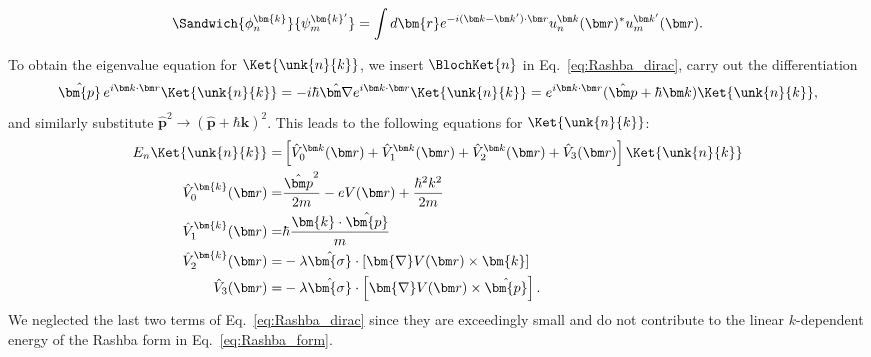 \begin{equation}
	\Sandwich{\phi_n^{\bm{k}}}{\psi_m^{\bm{k}'}} = \int d\bm{r} e^{-i (\bm k - \bm k') \cdot \bm r} u_n^{\bm k }(\bm r)^* u_m^{\bm k'}(\bm r).
\end{equation}

To obtain the eigenvalue equation for $\Ket{\unk{n}{k}}$, we insert $\BlochKet{n}$ in Eq.~\eqref{eq:Rashba_dirac}, carry out the differentiation
\begin{equation}
	\label{eq:Rashba_momentum}
\hat{\bm{p}} \, \Eikr\Ket{\unk{n}{k}} = -i \hbar \hat{\bm \nabla}\Eikr\Ket{\unk{n}{k}} = \Eikr(\hat{\bm p} + \hbar \bm k)\Ket{\unk{n}{k}},
\end{equation}
and similarly substitute $\hat{\bm{p}}^2 \rightarrow (\hat{\bm{p}}+\hbar \bm{k})^2$.
This leads to the following equations for $\Ket{\unk{n}{k}}$:
\begin{align}
	\label{eq:Rashba_unk_Vs}
	E_n \Ket{\unk{n}{k}} =& \left[\hat{V}_0^{\bm k}(\bm r) + \hat{V}_1^{\bm k}(\bm r)  +  \hat{V}_2^{\bm k}(\bm r) + \hat{V}_3(\bm r) \right] \Ket{\unk{n}{k}} \\
	\hat{V}_0^{\bm{k}}(\bm r) =& \frac{\hat{\bm p}^2}{2m} - eV(\bm r) + \frac{\hbar^2 k^2}{2m} \\
	\hat{V}_1^{\bm{k}}(\bm r) =& \hbar\frac{\bm{k}\cdot\hat{\bm{p}}}{m} \\
	\hat{V}_2^{\bm{k}}(\bm r) =& -\lambda \hat{\bm{\sigma}} \cdot \left[ \bm{\nabla}V(\bm r) \times \bm{k}\right] \\
	\hat{V}_3(\bm r) =& -\lambda \hat{\bm{\sigma}} \cdot \left[ \bm{\nabla}V(\bm r) \times \hat{\bm{p}}\right].
\end{align}
We neglected the last two terms of Eq.~\eqref{eq:Rashba_dirac} since they are exceedingly small and do not contribute to the linear $k$-dependent energy of the Rashba form in Eq.~\eqref{eq:Rashba_form}.

